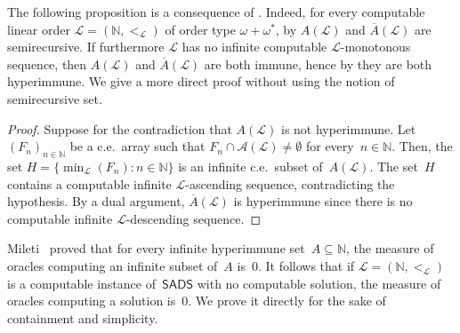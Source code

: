 \documentclass{article}
\numberwithin{theorem}{section}
\newtheorem{proposition}[theorem]{Proposition}
\def\L{\mathcal{L}}
\def\A{\mathcal{A}}
\newcommand{\SADS}{\mathsf{SADS}}
\newcommand{\NN}[0]{\mathbb{N}}
\begin{document}
The following proposition is a consequence of \cite[Theorem 4.1,Theorem 4.2]{jockusch1968semirecursive}. Indeed, for every computable linear order $\L = (\NN, <_\L)$ of order type $\omega+\omega^*$, by \cite[Theorem 4.1]{jockusch1968semirecursive} $A(\L)$ and $\overline{A}(\L)$ are semirecursive. If furthermore $\L$ has no infinite computable $\L$-monotonous sequence, then $A(\L)$ and  $\overline{A}(\L)$ are both immune, hence by \cite[Theorem 4.2]{jockusch1968semirecursive} they are both hyperimmune.
We give a more direct proof without using the notion of semirecursive set.

\begin{proof}
Suppose for the contradiction that $A(\L)$ is not hyperimmune.
Let $(F_n)_{n \in \NN}$ be a c.e.\ array such that $F_n \cap \A(\L) \neq \emptyset$ for every~$n \in \NN$.
Then, the set $H = \{ \min_\L(F_n) : n \in \NN \}$ is an infinite c.e.\ subset of~$A(\L)$. The set~$H$ contains  a computable infinite $\L$-ascending sequence, contradicting the hypothesis.
By a dual argument, $\overline{A}(\L)$ is hyperimmune since there is no computable infinite $\L$-descending sequence.
\end{proof}

Mileti~\cite[Theorem 5.2.6]{mileti2004partition} proved that for every infinite hyperimmune set~$A \subseteq \NN$, the measure of oracles computing an infinite subset of~$A$ is~0. It follows that if $\L = (\NN, <_\L)$ is a computable instance of~$\SADS$ with no computable solution, the measure of oracles computing a solution is~0. We prove it directly for the sake of containment and simplicity.
\end{document}
